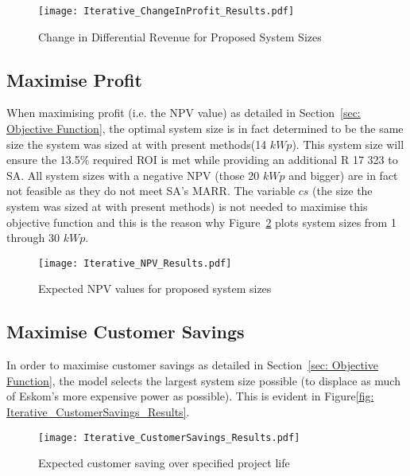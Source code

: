 \documentclass[a4paper,11pt,fleqn]{report}
\begin{document}
\begin{figure}[h]
\begin{center}
\texttt{[image: Iterative\_ChangeInProfit\_Results.pdf]}
\caption{Change in Differential Revenue for Proposed System Sizes}
\label{fig: iterative_ChangeInProfit_Results)}
\end{center}
\end{figure}

\subsection{Maximise Profit}
When maximising profit (i.e. the \ac{NPV} value) as detailed in Section~\ref{sec: Objective Function}, the optimal system size is in fact determined to be the same size the system was sized at with present methods(14 $kWp$). This system size will ensure the 13.5\% required \ac{ROI} is met while providing an additional R 17 323 to \ac{SA}. All system sizes with a negative \ac{NPV} (those 20 $kWp$ and bigger) are in fact not feasible as they do not meet \ac{SA}'s \ac{MARR}. The variable $cs$ (the size the system was sized at with present methods) is not needed to maximise this objective function and this is the reason why Figure~\ref{fig: Iterative_NPV_Results} plots system sizes from 1 through 30 $kWp$.

\begin{figure}[h]
\begin{center}
\texttt{[image: Iterative\_NPV\_Results.pdf]}
\caption{Expected NPV values for proposed system sizes}
\label{fig: Iterative_NPV_Results}
\end{center}
\end{figure}

\subsection{Maximise Customer Savings}
In order to maximise customer savings as detailed in Section~\ref{sec: Objective Function}, the model selects the largest system size possible (to displace as much of Eskom's more expensive power as possible). This is evident in Figure\ref{fig: Iterative_CustomerSavings_Results}.

\begin{figure}[H]
\begin{center}
\texttt{[image: Iterative\_CustomerSavings\_Results.pdf]}
\caption{Expected customer saving over specified project life}
\label{fig: Iterative_CustomerSavings_Results)}
\end{center}
\end{figure}
\end{document}
